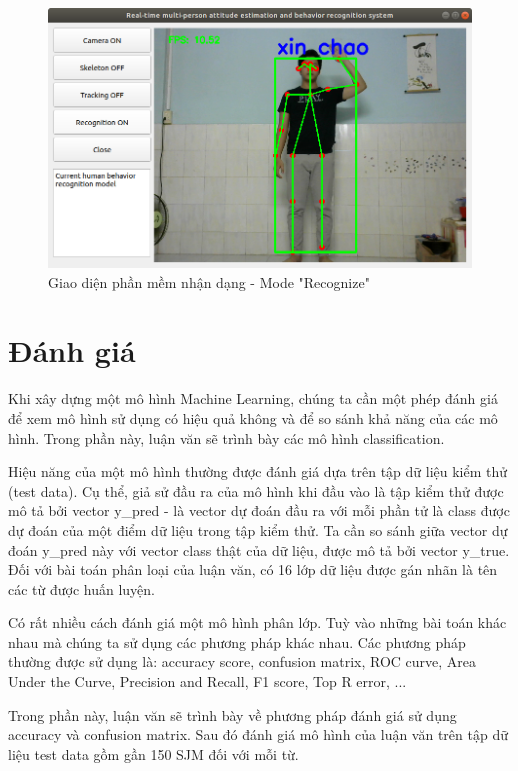 \begin{figure}[htp]
\begin{center}
\includegraphics[scale=0.5]{chap6/c6_figs/mode_recognize.png}
\end{center}
\caption{Giao diện phần mềm nhận dạng - Mode "Recognize"}
\label{fig:gui3}
\end{figure}
\FloatBarrier

\section{Đánh giá}
Khi xây dựng một mô hình Machine Learning, chúng ta cần một phép đánh giá để xem mô hình sử dụng có hiệu quả không và để so sánh khả năng của các mô hình. Trong phần này, luận văn sẽ trình bày các mô hình classification.

Hiệu năng của một mô hình thường được đánh giá dựa trên tập dữ liệu kiểm thử (test data). Cụ thể, giả sử đầu ra của mô hình khi đầu vào là tập kiểm thử được mô tả bởi vector y\_pred - là vector dự đoán đầu ra với mỗi phần tử là class được dự đoán của một điểm dữ liệu trong tập kiểm thử. Ta cần so sánh giữa vector dự đoán y\_pred này với vector class thật của dữ liệu, được mô tả bởi vector y\_true. Đối với bài toán phân loại của luận văn, có 16 lớp dữ liệu được gán nhãn là tên các từ được huấn luyện.


Có rất nhiều cách đánh giá một mô hình phân lớp. Tuỳ vào những bài toán khác nhau mà chúng ta sử dụng các phương pháp khác nhau. Các phương pháp thường được sử dụng là: accuracy score, confusion matrix, ROC curve, Area Under the Curve, Precision and Recall, F1 score, Top R error, ...

Trong phần này, luận văn sẽ trình bày về phương pháp đánh giá sử dụng accuracy và confusion matrix. Sau đó đánh giá mô hình của luận văn trên tập dữ liệu test data gồm gần 150 SJM đối với mỗi từ.

